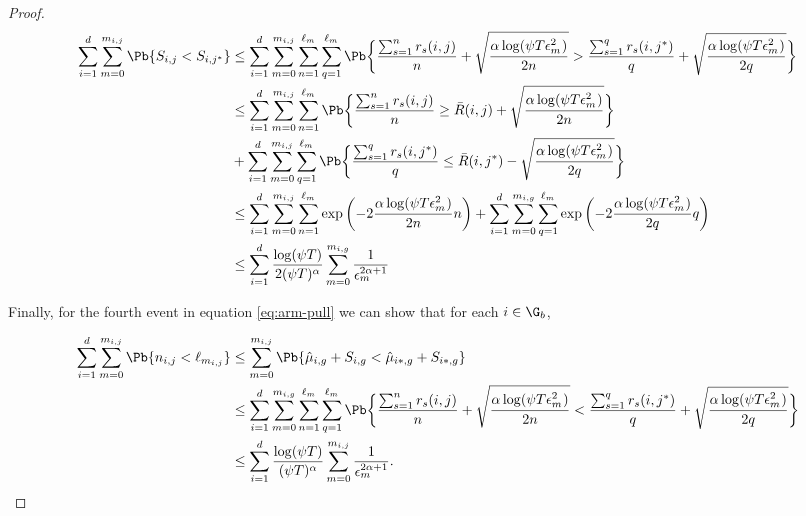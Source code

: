 \begin{proof}
\begin{align*}
\sum_{i=1}^{d}\sum_{m=0}^{m_{i,j}}\Pb\lbrace S_{i,j} < S_{i,j^*} \rbrace & \leq \sum_{i=1}^{d}\sum_{m=0}^{m_{i,j}}\sum_{n=1}^{\ell_{m_{}}}\sum_{q=1}^{\ell_{m_{}}}\Pb\bigg\lbrace  \dfrac{\sum_{s=1}^{n} r_{s}(i,j)}{n} + \sqrt{\dfrac{\alpha\log(\psi T\epsilon_{m_{}}^2)}{2n}} >  \dfrac{\sum_{s=1}^{q} r_{s}(i,j^*)}{q} + \sqrt{\dfrac{\alpha\log(\psi T\epsilon_{m_{}}^2)}{2q}} \bigg\rbrace \\
& \leq \sum_{i=1}^{d}\sum_{m=0}^{m_{i,j}}\sum_{n =1}^{\ell_{m_{}}}\Pb\bigg\lbrace  \dfrac{\sum_{s=1}^{n} r_{s}(i,j)}{n} \geq  \bar{R}(i,j) + \sqrt{\dfrac{\alpha\log(\psi T\epsilon_{m_{}}^2)}{2n}} \bigg\rbrace \\
&+  \sum_{i=1}^{d}\sum_{m=0}^{m_{i,j}}\sum_{q =1}^{\ell_{m_{}}}\Pb\bigg\lbrace  \dfrac{\sum_{s=1}^{q} r_{s}(i,j^*)}{q} \leq  \bar{R}(i,j^*) - \sqrt{\dfrac{\alpha\log(\psi T\epsilon_{m_{}}^2)}{2q}} \bigg\rbrace\\
&\leq \sum_{i=1}^{d}\sum_{m=0}^{m_{i,j}}\sum_{n=1}^{\ell_{m_{}}}\exp\left(-2\dfrac{\alpha\log(\psi T\epsilon_{m_{}}^2)}{2n}n \right) + \sum_{i=1}^{d}\sum_{m=0}^{m_{i,g}}\sum_{q=1}^{\ell_{m_{}}}\exp\left(-2\dfrac{\alpha\log(\psi T\epsilon_{m_{}}^2)}{2q}q \right)\\
&\leq \sum_{i=1}^{d}\dfrac{\log(\psi T )}{2(\psi T)^{\alpha}}\sum_{m=0}^{m_{i,g}}\dfrac{1}{\epsilon_{m_{}}^{2\alpha +1}}
\end{align*}

Finally, for the fourth event in equation \ref{eq:arm-pull} we can show that for each $i\in\G_b$,

\begin{align*}
\sum_{i=1}^{d}\sum_{m=0}^{m_{i,j}}\Pb\lbrace n_{i,j} < \ell_{m_{i,j}}\rbrace &\leq \sum_{m=0}^{m_{i,j}}\Pb\lbrace \hat{\mu}_{i,g} + S_{i,g} < \hat{\mu}_{i*,g} + S_{i*,g} \rbrace\\
&\leq \sum_{i=1}^{d}\sum_{m=0}^{m_{i,g}}\sum_{n=1}^{\ell_{m_{}}}\sum_{q=1}^{\ell_{m_{}}}\Pb\bigg\lbrace  \dfrac{\sum_{s=1}^{n}  r_{s}(i,j)}{n} + \sqrt{\dfrac{\alpha\log(\psi T\epsilon_{m_{}}^2)}{2n}} <  \dfrac{\sum_{s=1}^{q} r_{s}(i,j^*)}{q} + \sqrt{\dfrac{\alpha\log(\psi T\epsilon_{m_{}}^2)}{2q}} \bigg\rbrace \\
&\leq \sum_{i=1}^{d}\dfrac{\log(\psi T)}{(\psi T)^{\alpha}}\sum_{m=0}^{m_{i,j}}\dfrac{1}{\epsilon_{m}^{2\alpha +1}}.
\end{align*}



\end{proof}
